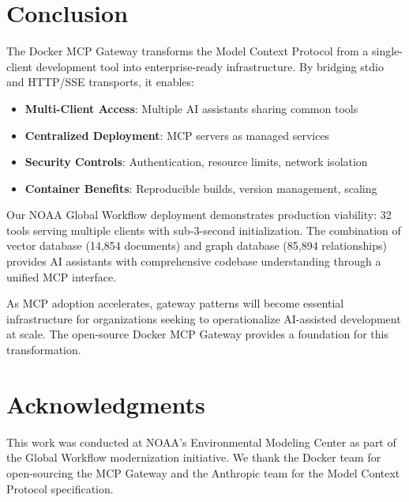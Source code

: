 \documentclass[11pt,letterpaper]{article}
\begin{document}
\section{Conclusion}

The Docker MCP Gateway transforms the Model Context Protocol from a single-client development tool into enterprise-ready infrastructure. By bridging stdio and HTTP/SSE transports, it enables:

\begin{itemize}[noitemsep]
    \item \textbf{Multi-Client Access}: Multiple AI assistants sharing common tools
    \item \textbf{Centralized Deployment}: MCP servers as managed services
    \item \textbf{Security Controls}: Authentication, resource limits, network isolation
    \item \textbf{Container Benefits}: Reproducible builds, version management, scaling
\end{itemize}

Our NOAA Global Workflow deployment demonstrates production viability: 32 tools serving multiple clients with sub-3-second initialization. The combination of vector database (14,854 documents) and graph database (85,894 relationships) provides AI assistants with comprehensive codebase understanding through a unified MCP interface.

As MCP adoption accelerates, gateway patterns will become essential infrastructure for organizations seeking to operationalize AI-assisted development at scale. The open-source Docker MCP Gateway provides a foundation for this transformation.

\section*{Acknowledgments}

This work was conducted at NOAA's Environmental Modeling Center as part of the Global Workflow modernization initiative. We thank the Docker team for open-sourcing the MCP Gateway and the Anthropic team for the Model Context Protocol specification.
\end{document}
